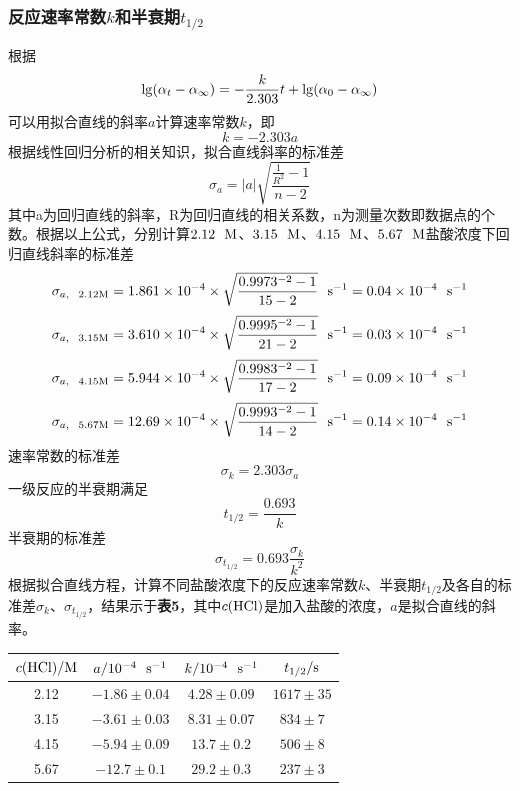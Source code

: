 \documentclass[12pt]{article}
\begin{document}
\subsubsection{反应速率常数$k$和半衰期$t_{1/2}$}
根据
$$
{\rm lg}(\alpha_{t}-\alpha_{\infty})=-\frac{k}{2.303}t+{\rm lg}(\alpha_{0}-\alpha_{\infty})
$$
可以用拟合直线的斜率$a$计算速率常数$k$，即
$$
k=-2.303a
$$
根据线性回归分析的相关知识，拟合直线斜率的标准差
$$
\sigma_{a}=|a|\sqrt{\frac{\frac{1}{R^{2}}-1}{n-2}}
$$
其中a为回归直线的斜率，R为回归直线的相关系数，n为测量次数即数据点的个数。根据以上公式，分别计算$2.12\ \ {\rm M}$、$3.15\ \ {\rm M}$、$4.15\ \ {\rm M}$、$5.67\ \ {\rm M}$盐酸浓度下回归直线斜率的标准差
$$
\sigma_{a,\ \ {\rm 2.12 M}}=1.861\times10^{-4}\times\sqrt{\frac{0.9973^{-2}-1}{15-2}}\ \ {\rm s^{-1}}=0.04\times10^{-4}\ \ {\rm s^{-1}}
$$
$$
\sigma_{a,\ \ {\rm 3.15 M}}=3.610\times10^{-4}\times\sqrt{\frac{0.9995^{-2}-1}{21-2}}\ \ {\rm s^{-1}}=0.03\times10^{-4}\ \ {\rm s^{-1}}
$$
$$
\sigma_{a,\ \ {\rm 4.15 M}}=5.944\times10^{-4}\times\sqrt{\frac{0.9983^{-2}-1}{17-2}}\ \ {\rm s^{-1}}=0.09\times10^{-4}\ \ {\rm s^{-1}}
$$
$$
\sigma_{a,\ \ {\rm 5.67 M}}=12.69\times10^{-4}\times\sqrt{\frac{0.9993^{-2}-1}{14-2}}\ \ {\rm s^{-1}}=0.14\times10^{-4}\ \ {\rm s^{-1}}
$$
速率常数的标准差
$$
\sigma_{k}=2.303\sigma_{a}
$$
一级反应的半衰期满足
$$
t_{1/2}=\frac{0.693}{k}
$$
半衰期的标准差
$$
\sigma_{t_{1/2}}=0.693\frac{\sigma_{k}}{k^{2}}
$$
根据拟合直线方程，计算不同盐酸浓度下的反应速率常数$k$、半衰期$t_{1/2}$及各自的标准差$\sigma_{k}$、$\sigma_{t_{1/2}}$，结果示于\textbf{表5}，其中$c({\rm HCl})$是加入盐酸的浓度，$a$是拟合直线的斜率。
\begin{table}[h]
	\centering
	\begin{tabular}{cccc}
		\toprule

		$c({\rm HCl}) / {\rm M}$ & $a/{\rm 10^{-4} \ \ s^{-1}}$ & $k/{\rm 10^{-4} \ \ s^{-1}}$ & $t_{1/2} /{\rm s}$\\
		\midrule
		2.12 & $-1.86\pm 0.04$ &  $4.28\pm 0.09$ & $1617\pm 35$ \\
		3.15 & $-3.61\pm 0.03$ &  $8.31\pm 0.07$ & $834\pm 7$ \\
		4.15 & $-5.94\pm 0.09$ & $13.7\pm 0.2$ & $506\pm 8$ \\
		5.67 & $-12.7\pm 0.1$ & $29.2\pm 0.3$ & $237\pm 3$ \\
		
		\bottomrule
	\end{tabular}
\end{table}
\par
\end{document}
